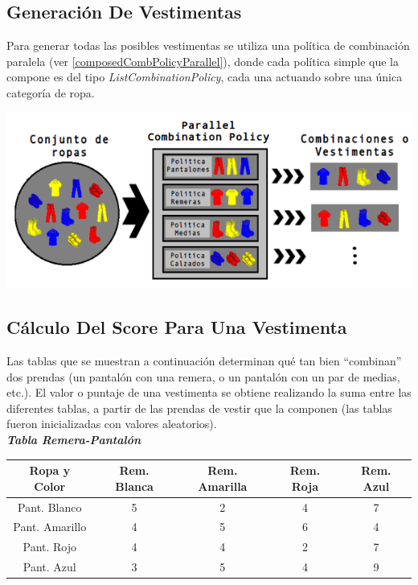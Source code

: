 \subsection{Generaci\'on De Vestimentas}
Para generar todas las posibles vestimentas se utiliza una pol\'itica de combinaci\'on paralela (ver \ref{composedCombPolicyParallel}), donde cada pol\'itica
simple que la compone es del tipo \emph{ListCombinationPolicy}, cada una actuando sobre una \'unica categor\'ia de ropa.
\begin{center}
  \includegraphics[width=\linewidth]{images/sequencial_ropa.png} 
\end{center}
\newpage
\subsection{C\'alculo Del Score Para Una Vestimenta}
Las tablas que se muestran a continuaci\'on determinan qu\'e tan bien ``combinan'' dos prendas (un pantal\'on con una remera, o un pantal\'on con un
par de medias, etc.). El valor o puntaje de una vestimenta se obtiene realizando la suma entre las diferentes tablas, a partir de las prendas de
vestir que la componen (las tablas fueron inicializadas con valores aleatorios). \\

\textbf{\emph{Tabla Remera-Pantal\'on}}\\

\begin{tabular}{|c|c|c|c|c|}
  \hline Ropa y Color        & Rem. Blanca & Rem. Amarilla      & Rem. Roja  & Rem. Azul \\ 
  \hline Pant. Blanco   & 5           & 2                & 4            &  7          \\
  \hline Pant. Amarillo & 4           & 5                & 6            &  4          \\ 
  \hline Pant. Rojo     & 4           & 4                & 2            &  7          \\ 
  \hline Pant. Azul     & 3           & 5                & 4            &  9          \\  
  \hline 
\end{tabular}

